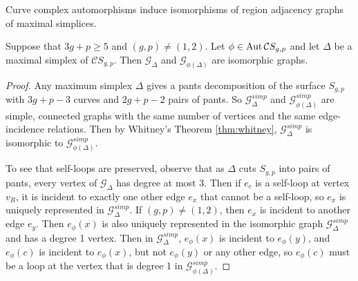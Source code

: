 \begin{example}
\end{example}



\begin{corollary}
  Curve complex automorphisms induce isomorphisms of
  region adjacency graphs of maximal simplices.

  Suppose that $3g+p\geq 5$  and $(g,p)\neq(1,2)$.
  Let $\phi \in \operatorname{Aut} \mathcal C S_{g,p}$
  and let $\Delta$ be a maximal simplex of $\mathcal C S_{g,p}$.
  Then $\mathcal G_\Delta$ and
  $\mathcal G_{\phi(\Delta)}$
  are isomorphic graphs.
  \label{cor:adjgraph}
\end{corollary}

\begin{proof}
  Any maximum simplex $\Delta$
  gives a pants decomposition of the surface $S_{g,p}$
  with $3g+p-3$ curves and $2g+p-2$ pairs of pants.
  So $\mathcal G^{simp}_\Delta$
  and
  $\mathcal G^{simp}_{\phi(\Delta)}$
  are simple, connected graphs with the same number of
  vertices and the same edge-incidence relations.
  Then by Whitney's Theorem \ref{thm:whitney},
  $\mathcal G^{simp}_\Delta$ is isomorphic to
  $\mathcal G^{simp}_{\phi(\Delta)}$.

  To see that self-loops are preserved, observe
  that as $\Delta$ cuts $S_{g,p}$ into pairs of pants,
  every vertex of $\mathcal G_\Delta$ has degree at most 3.
  Then if $e_c$ is a self-loop at vertex $v_R$,
  it is incident to exactly one other edge $e_x$
  that cannot be a self-loop, so $e_x$ is uniquely represented in $\mathcal G^{simp}_\Delta$.
  If $(g,p) \neq (1,2)$, then $e_x$ is incident to another edge $e_y$.
  Then $e_\phi(x)$ is
  also uniquely represented in the isomorphic graph $\mathcal G^{simp}_\Delta$
  and has a degree 1 vertex.
  Then in $\mathcal G^{simp}_\Delta$, $e_\phi(x)$
  is incident to $e_\phi(y)$, and $e_\phi(c)$ is incident to $e_\phi(x)$,
  but not $e_\phi(y)$ or any other edge, so $e_\phi(c)$   must be a loop at the vertex
  that is degree 1 in $\mathcal G^{simp}_{\phi(\Delta)}$.
\end{proof}


